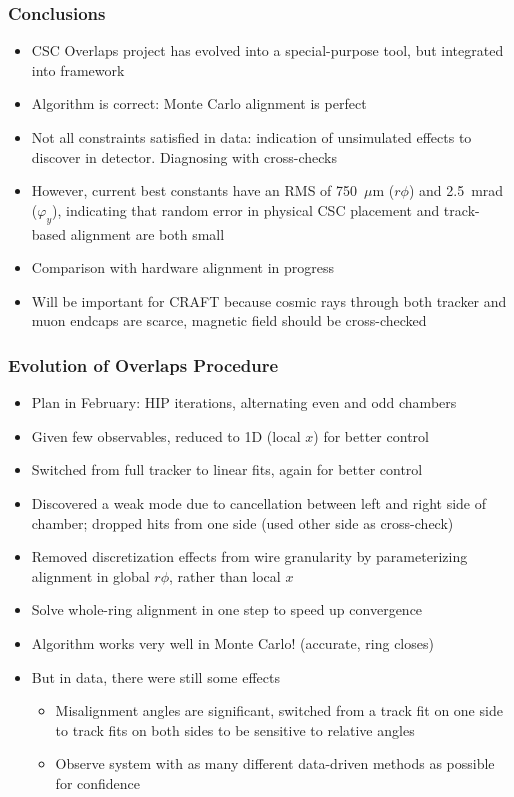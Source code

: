 \documentclass[compress]{beamer}
\begin{document}
\begin{frame}
\frametitle{Conclusions}

\begin{itemize}\setlength{\itemsep}{0.35 cm}
\item CSC Overlaps project has evolved into a special-purpose tool,
  but integrated into framework

\item Algorithm is correct: Monte Carlo alignment is perfect

\item Not all constraints satisfied in data: indication of unsimulated
  effects to discover in detector.  Diagnosing with cross-checks

\item However, current best constants have an RMS of 750~$\mu$m
  ($r\phi$) and 2.5~mrad ($\varphi_y$), indicating that random error
  in physical CSC placement and track-based alignment are both small

\item Comparison with hardware alignment in progress

\item Will be important for CRAFT because cosmic rays through both tracker
  and muon endcaps are scarce, magnetic field should be cross-checked
\end{itemize}

\label{numpages}
\end{frame}

\begin{frame}
\frametitle{Evolution of Overlaps Procedure}
\small
\begin{itemize}
  \item Plan in February: HIP iterations, alternating even and odd chambers
  \item Given few observables, reduced to 1D (local $x$) for better control
  \item Switched from full tracker to linear fits, again for better control
  \item Discovered a weak mode due to cancellation between left and
    right side of chamber; dropped hits from one side (used other side
    as cross-check)
  \item Removed discretization effects from wire granularity by
    parameterizing alignment in global $r\phi$, rather than local $x$
  \item Solve whole-ring alignment in one step to speed up convergence
  \item Algorithm works very well in Monte Carlo!  (accurate, ring closes)
  \item But in data, there were still some effects
\begin{itemize}
  \item Misalignment angles are significant, switched from a track fit
    on one side to track fits on both sides to be sensitive to
    relative angles
  \item Observe system with as many different data-driven methods as
    possible for confidence
\end{itemize}
\end{itemize}
\end{frame}
\end{document}
